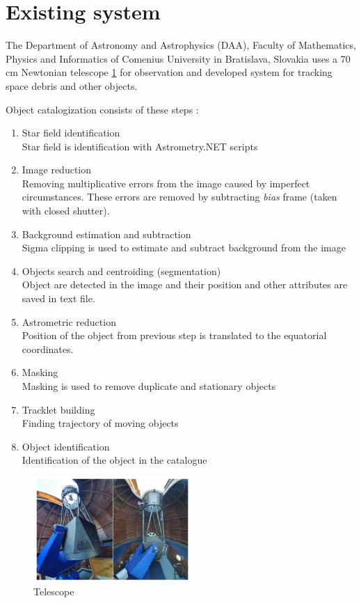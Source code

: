 \section{Existing system}

The Department of Astronomy and Astrophysics
(DAA), Faculty of Mathematics, Physics and Informatics of Comenius University in Bratislava, Slovakia uses a 70 cm Newtonian telescope \ref{fig:telescope} for observation and developed system for tracking space debris and other objects.

Object catalogization consists of these steps \cite{krajvcovivc2019selected}:
\begin{enumerate}
    \item Star field identification\\
    Star field is identification with Astrometry.NET scripts
    \item Image reduction\\ 
    Removing multiplicative errors from the image caused by imperfect circumstances. These errors are removed by subtracting \textit{bias} frame (taken with closed shutter).
    \item Background estimation and subtraction\\
    Sigma clipping is used to estimate and subtract background from the image
    \item Objects search and centroiding (segmentation)\\
    Object are detected in the image and their position and other attributes are saved in text file.
    \item Astrometric reduction\\
    Position of the object from previous step is translated to the equatorial coordinates.
    \item Masking\\
    Masking is used to remove duplicate and stationary objects
    \item Tracklet building\\
    Finding trajectory of moving objects
    \item Object identification\\
    Identification of the object in the catalogue

\end{enumerate}

\begin{figure}[h!]
    \centering
    \includegraphics[width=60mm]{chapters/images/telescope.PNG}
    \caption{Telescope}
    \label{fig:telescope}
\end{figure}


